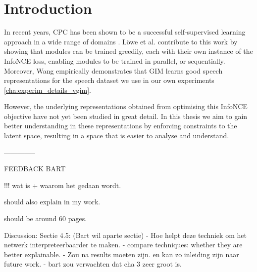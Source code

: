 \chapter{Introduction}

\setcounter{page}{1} %


In recent years, CPC has been shown to be a successful self-supervised learning approach in a wide range of domains \cite{stackeEvaluationContrastivePredictive2020, dehaanContrastivePredictiveCoding2021, luSemiSupervisedHistologyClassification2019, bhatiSegmentalContrastivePredictive2021b, deldariTimeSeriesChange2021, henaffDataEfficientImageRecognition2020}. Löwe et al. contribute to this work by showing that modules can be trained greedily, each with their own instance of the InfoNCE loss, enabling modules to be trained in parallel, or sequentially. Moreover, Wang \cite{meihanwangSpeechRepresentationLearning2019} empirically demonstrates that GIM learns good speech representations for the speech dataset we use in our own experiments \ref{cha:experim_details_vgim}.

However, the underlying representations obtained from optimising this InfoNCE objective have not yet been studied in great detail. In this thesis we aim to gain better understanding in these representations by enforcing constraints to the latent space, resulting in a space that is easier to analyse and understand.



















--------------


FEEDBACK BART

!!!
wat is + waarom het gedaan wordt.

should also explain in my work.

should be around 60 pages.

Discussion:
Sectie 4.5: (Bart wil aparte sectie)
- Hoe helpt deze techniek om het netwerk interpreteerbaarder te maken.
- compare techniques: whether they are better explainable.
- Zou na results moeten zijn. en kan zo inleiding zijn naar future work.
- bart zou verwachten dat cha 3 zeer groot is.

